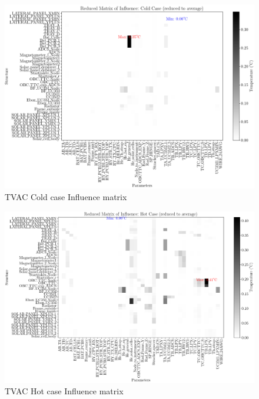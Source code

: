 \begin{figure}[H]
    \centering
    \includegraphics[width = \linewidth]{Figures/UPMSat3/TVAC/infmatCC.png}
    \caption{TVAC Cold case Influence matrix}
    \label{fig:TCC-infmat}
\end{figure}
\begin{figure}[H]
    \centering
    \includegraphics[width = \linewidth]{Figures/UPMSat3/TVAC/infmatHC.png}
    \caption{TVAC Hot case Influence matrix}
    \label{fig:THC-infmat}
\end{figure}